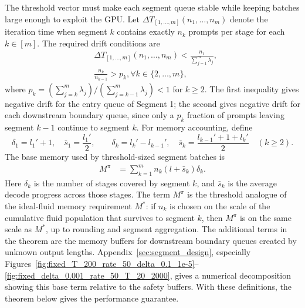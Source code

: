 The threshold vector must make each segment queue stable while keeping batches large enough to exploit the GPU. Let \(\Delta T_{[1,\dots,m]}(n_1,\dots,n_m)\) denote the iteration time when segment \(k\) contains exactly \(n_k\) prompts per stage for each \(k\in[m]\). The required drift conditions are
\begin{equation}
    \label{eq:nested_wait_thresholds}
    \begin{aligned}
    &\Delta T_{[1,\dots,m]}(n_1, \dots, n_m) <\frac{n_1}{\sum_{j=1}^m \lambda_j}, \\
    &\frac{n_k}{n_{k-1}} > p_k,\forall k \in \{2, \dots, m\},
    \end{aligned}
\end{equation}
where \(p_k = (\sum_{j=k}^m\lambda_j)/(\sum_{j=k-1}^m\lambda_j)<1\) for \(k\ge2\). The first inequality gives negative drift for the entry queue of Segment 1; the second gives negative drift for each downstream boundary queue, since only a \(p_k\) fraction of prompts leaving segment \(k-1\) continue to segment \(k\). For memory accounting, define
\[
\delta_1=l_1'+1,\quad \bar s_1=\frac{l_1'}{2},\qquad
\delta_k=l_k'-l_{k-1}',\quad \bar s_k=\frac{l_{k-1}'+1+l_k'}{2}\quad (k\ge2).
\]
The base memory used by threshold-sized segment batches is
\begin{equation}
    \label{eq:nested_wait_memory}
\begin{aligned}
        M^\pi &= \sum_{k=1}^m n_k (l+\bar s_k)\delta_k .
\end{aligned}
\end{equation}
Here \(\delta_k\) is the number of stages covered by segment \(k\), and \(\bar s_k\) is the average decode progress across those stages. The term \(M^\pi\) is the threshold analogue of the ideal-fluid memory requirement \(M^*\): if \(n_k\) is chosen on the scale of the cumulative fluid population that survives to segment \(k\), then \(M^\pi\) is on the same scale as \(M^*\), up to rounding and segment aggregation. The additional terms in the theorem are the memory buffers for downstream boundary queues created by unknown output lengths. Appendix~\ref{sec:segment_design}, especially Figures~\ref{fig:fixed_T_200_rate_50_delta_0.1_1e-5}--\ref{fig:fixed_delta_0.001_rate_50_T_20_2000}, gives a numerical decomposition showing this base term relative to the safety buffers. With these definitions, the theorem below gives the performance guarantee.

